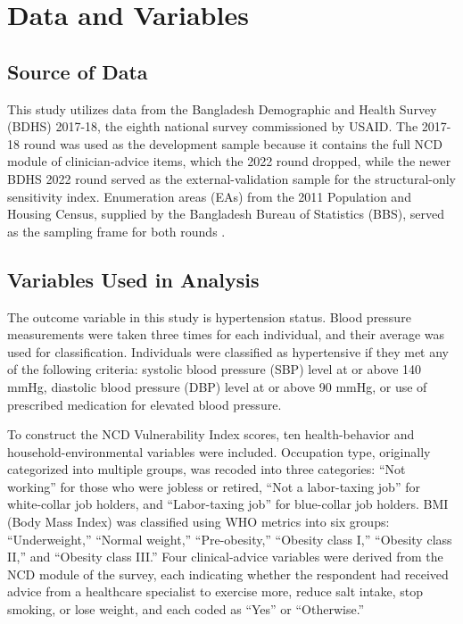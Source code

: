 \documentclass[
  12pt,
  a4paper]{article}
\begin{document}
\section{Data and Variables}\label{data-and-variables}

\subsection{Source of Data}\label{source-of-data}

This study utilizes data from the Bangladesh Demographic and Health Survey (BDHS) 2017-18, the eighth national survey commissioned by USAID. The 2017-18 round was used as the development sample because it contains the full NCD module of clinician-advice items, which the 2022 round dropped, while the newer BDHS 2022 round served as the external-validation sample for the structural-only sensitivity index. Enumeration areas (EAs) from the 2011 Population and Housing Census, supplied by the Bangladesh Bureau of Statistics (BBS), served as the sampling frame for both rounds \citep{bdhs2018misc}.

\subsection{Variables Used in Analysis}\label{variables-used-in-analysis}

The outcome variable in this study is hypertension status. Blood pressure measurements were taken three times for each individual, and their average was used for classification. Individuals were classified as hypertensive if they met any of the following criteria: systolic blood pressure (SBP) level at or above 140 mmHg, diastolic blood pressure (DBP) level at or above 90 mmHg, or use of prescribed medication for elevated blood pressure.

To construct the NCD Vulnerability Index scores, ten health-behavior and household-environmental variables were included. Occupation type, originally categorized into multiple groups, was recoded into three categories: ``Not working'' for those who were jobless or retired, ``Not a labor-taxing job'' for white-collar job holders, and ``Labor-taxing job'' for blue-collar job holders. BMI (Body Mass Index) was classified using WHO metrics into six groups: ``Underweight,'' ``Normal weight,'' ``Pre-obesity,'' ``Obesity class I,'' ``Obesity class II,'' and ``Obesity class III.'' Four clinical-advice variables were derived from the NCD module of the survey, each indicating whether the respondent had received advice from a healthcare specialist to exercise more, reduce salt intake, stop smoking, or lose weight, and each coded as ``Yes'' or ``Otherwise.''
\end{document}
